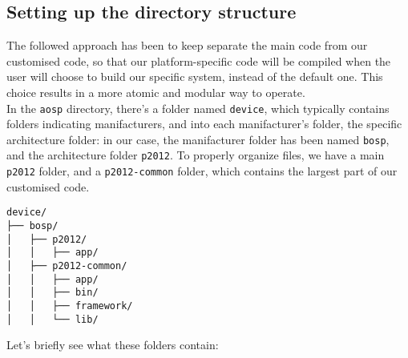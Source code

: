 \subsection{Setting up the directory structure}
The followed approach has been to keep separate the main code from our customised code, so that our platform-specific code will be compiled when the user will choose to build our specific system, instead of the default one. This choice results in a more atomic and modular way to operate.\\
In the \texttt{aosp} directory, there's a folder named \texttt{device}, which typically contains folders indicating manifacturers, and into each manifacturer's folder, the specific architecture folder: in our case, the manifacturer folder has been named \texttt{bosp}, and the architecture folder \texttt{p2012}. To properly organize files, we have a main \texttt{p2012} folder, and a \texttt{p2012-common} folder, which contains the largest part of our customised code.
\begin{verbatim}
device/
├── bosp/
│   ├── p2012/
│   │   ├── app/
│   ├── p2012-common/
│   │   ├── app/
│   │   ├── bin/
│   │   ├── framework/
│   │   └── lib/
\end{verbatim}
Let's briefly see what these folders contain:
